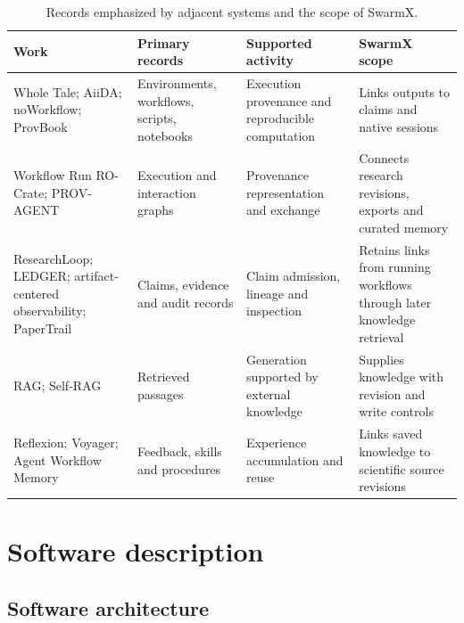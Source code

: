 \documentclass[preprint,12pt,a4paper]{elsarticle}
\begin{document}
\begin{table}[!htbp]
\centering
\caption{Records emphasized by adjacent systems and the scope of SwarmX.}
\label{tab:related}
\scriptsize
\renewcommand{\arraystretch}{1.12}
\begin{tabularx}{\textwidth}{@{}>{\raggedright\arraybackslash}p{}>{\raggedright\arraybackslash}p{}YY@{}}
\toprule
\textbf{Work} & \textbf{Primary records} & \textbf{Supported activity} & \textbf{SwarmX scope} \\
\midrule
Whole Tale; AiiDA; noWorkflow; ProvBook~\cite{brinckman2019,pizzi2016,pimentel2017,samuel2018} & Environments, workflows, scripts, notebooks & Execution provenance and reproducible computation & Links outputs to claims and native sessions \\
Workflow Run RO-Crate; PROV-AGENT~\cite{leo2024,souza2025a} & Execution and interaction graphs & Provenance representation and exchange & Connects research revisions, exports and curated memory \\
ResearchLoop; LEDGER; artifact-centered observability; PaperTrail~\cite{xia2026,kim2026,yin2026,martin-boyle2026} & Claims, evidence and audit records & Claim admission, lineage and inspection & Retains links from running workflows through later knowledge retrieval \\
RAG; Self-RAG~\cite{lewis2020rag,asai2023selfrag} & Retrieved passages & Generation supported by external knowledge & Supplies knowledge with revision and write controls \\
Reflexion; Voyager; Agent Workflow Memory~\cite{shinn2023reflexion,wang2023voyager,wang2024workflowmemory} & Feedback, skills and procedures & Experience accumulation and reuse & Links saved knowledge to scientific source revisions \\
\bottomrule
\end{tabularx}
\end{table}
\FloatBarrier

\section{Software description}
\label{sec:software}

\subsection{Software architecture}
\label{sec:architecture}
\end{document}
